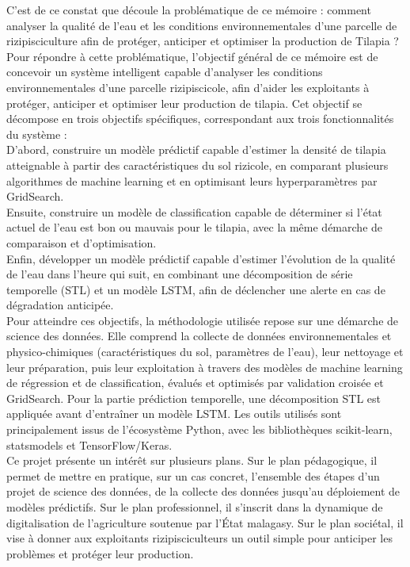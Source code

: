 \documentclass[a4paper,12pt, oneside]{article}
\begin{document}
C'est de ce constat que découle la problématique de ce mémoire : comment analyser la qualité de l'eau et les conditions environnementales d'une parcelle de rizipisciculture afin de protéger, anticiper et optimiser la production de Tilapia ?\\

Pour répondre à cette problématique, l'objectif général de ce mémoire est de concevoir un système intelligent capable d'analyser les conditions environnementales d'une parcelle rizipiscicole, afin d'aider les exploitants à protéger, anticiper et optimiser leur production de tilapia. Cet objectif se décompose en trois objectifs spécifiques, correspondant aux trois fonctionnalités du système :\\
D'abord, construire un modèle prédictif capable d'estimer la densité de tilapia atteignable à partir des caractéristiques du sol rizicole, en comparant plusieurs algorithmes de machine learning et en optimisant leurs hyperparamètres par GridSearch.\\
Ensuite, construire un modèle de classification capable de déterminer si l'état actuel de l'eau est bon ou mauvais pour le tilapia, avec la même démarche de comparaison et d'optimisation.\\
Enfin, développer un modèle prédictif capable d'estimer l'évolution de la qualité de l'eau dans l'heure qui suit, en combinant une décomposition de série temporelle (STL) et un modèle LSTM, afin de déclencher une alerte en cas de dégradation anticipée.\\

Pour atteindre ces objectifs, la méthodologie utilisée repose sur une démarche de science des données. Elle comprend la collecte de données environnementales et physico-chimiques (caractéristiques du sol, paramètres de l'eau), leur nettoyage et leur préparation, puis leur exploitation à travers des modèles de machine learning de régression et de classification, évalués et optimisés par validation croisée et GridSearch. Pour la partie prédiction temporelle, une décomposition STL est appliquée avant d'entraîner un modèle LSTM. Les outils utilisés sont principalement issus de l'écosystème Python, avec les bibliothèques scikit-learn, statsmodels et TensorFlow/Keras.\\

Ce projet présente un intérêt sur plusieurs plans. Sur le plan pédagogique, il permet de mettre en pratique, sur un cas concret, l'ensemble des étapes d'un projet de science des données, de la collecte des données jusqu'au déploiement de modèles prédictifs. Sur le plan professionnel, il s'inscrit dans la dynamique de digitalisation de l'agriculture soutenue par l'État malagasy. Sur le plan sociétal, il vise à donner aux exploitants rizipisciculteurs un outil simple pour anticiper les problèmes et protéger leur production.\\
\end{document}
